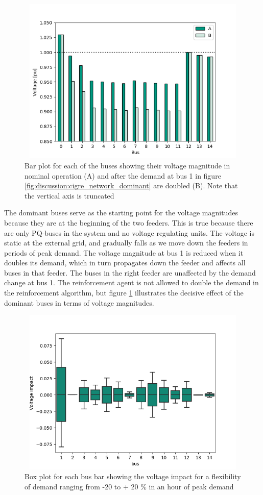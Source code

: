 \documentclass[class=book, crop=false, 11pt]{standalone}
\begin{document}
\begin{figure}[ht!]
    \center
\includegraphics[height=8cm, width=12cm]{figures/double_large_load.png}
    \caption {Bar plot for each of the buses showing their voltage magnitude in nominal operation (A) and after the demand at bus 1 in figure \ref{fig:discussion:cigre_network_dominant} are doubled (B). Note that the vertical axis is truncated}
    \label{fig:discussion:double_large_load}
\end{figure}
The dominant buses serve as the starting point for the voltage magnitudes because they are at the beginning of the two feeders. This is true because there are only PQ-buses in the system and no voltage regulating units. The voltage is static at the external grid, and gradually falls as we move down the feeders in periods of peak demand. The voltage magnitude at bus 1 is reduced when it doubles its demand, which in turn propagates down the feeder and affects all buses in that feeder. The buses in the right feeder are unaffected by the demand change at bus 1. The reinforcement agent is not allowed to double the demand in the reinforcement algorithm, but figure \ref{fig:discussion:double_large_load} illustrates the decisive effect of the dominant buses in terms of voltage magnitudes.

\begin{figure}[hb!]
    \center
\includegraphics[height=8cm, width=12cm]{figures/voltage_impact.png}
    \caption{Box plot for each bus bar showing the voltage impact for a flexibility of demand ranging from -20 to + 20 \% in an hour of peak demand}
    \label{fig:discussion:voltage_impact}
\end{figure}
\end{document}
